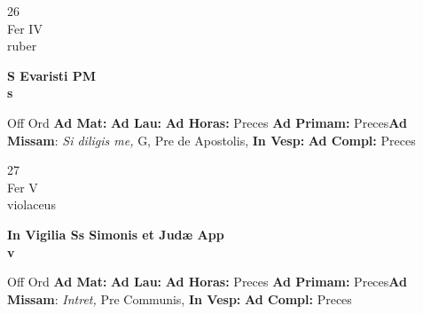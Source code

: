 \documentclass[10pt, openany]{book}
\begin{document}
    \begin{center}
        \begin{minipage}{3.5in}
            \vspace{2em}
            \begin{minipage}{0.5in}
                {\Huge 26} \\
                {\normalsize Fer IV} \\
                {\normalsize ruber}
            \end{minipage}
            \begin{minipage}{3.0in}
                \textbf{ \large S Evaristi PM \\
                \textnormal{\normalsize s}} \\ 
            \end{minipage}
            \begin{justify}Off Ord
                \textbf{Ad Mat: }
                \textbf{Ad Lau: }
                \textbf{Ad Horas: }Preces
                \textbf{Ad Primam: }Preces\textbf{Ad Missam}: \textit{Si diligis me,} G, Pre de Apostolis,  
                \textbf{In Vesp: }
                \textbf{Ad Compl: }Preces
            \end{justify}
        \end{minipage}
    \end{center}

    \begin{center}
        \begin{minipage}{3.5in}
            \vspace{2em}
            \begin{minipage}{0.5in}
                {\Huge 27} \\
                {\normalsize Fer V} \\
                {\normalsize violaceus}
            \end{minipage}
            \begin{minipage}{3.0in}
                \textbf{ \large In Vigilia Ss Simonis et Judæ App \\
                \textnormal{\normalsize v}} \\ 
            \end{minipage}
            \begin{justify}Off Ord
                \textbf{Ad Mat: }
                \textbf{Ad Lau: }
                \textbf{Ad Horas: }Preces
                \textbf{Ad Primam: }Preces\textbf{Ad Missam}: \textit{Intret,} Pre Communis,  
                \textbf{In Vesp: }
                \textbf{Ad Compl: }Preces
            \end{justify}
        \end{minipage}
    \end{center}
\end{document}
